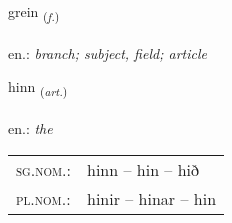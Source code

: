 \documentclass[frontgrid, backgrid]{flacards}\usepackage[]{graphicx}\usepackage[]{xcolor}
\begin{document}
\renewcommand{\flhead}{\vskip5pt \fboxsep=0pt {\small\bfseries\footnotesize Nafnorð | Noun}}
\renewcommand{\fcfoot}{\vskip5pt \fboxsep=0pt \hspace{2pt}{\small\bfseries\footnotesize 1K}}

\renewcommand{\blhead}{\vskip5pt {\small\bfseries\footnotesize Nafnorð | Noun }}
\renewcommand{\bcfoot}{\vskip5pt \hspace{2pt}{\small\bfseries\footnotesize 1K}}


{grein \small{\textsubscript{(\textit{f.})}} \\[1ex] %
\textphonetic{[kreiːn]} \\
en.: \emph{branch; subject, field; article} \\  [2ex]
\renewcommand*{\arraystretch}{0.8}
}

\renewcommand{\flhead}{\vskip5pt \fboxsep=0pt {\small\bfseries\footnotesize Greinir | Article}}
\renewcommand{\fcfoot}{\vskip5pt \fboxsep=0pt \hspace{2pt}{\small\bfseries\footnotesize 1K}}

\renewcommand{\blhead}{\vskip5pt {\small\bfseries\footnotesize Greinir | Article }}
\renewcommand{\bcfoot}{\vskip5pt \hspace{2pt}{\small\bfseries\footnotesize 1K}}


{hinn \small{\textsubscript{(\textit{art.})}} \\[1ex] %
\textphonetic{[hɪn]} \\
en.: \emph{the} \\  [2ex]
\renewcommand*{\arraystretch}{0.8}
\begin{tabular}{ll}
\textsc{sg.nom.}: & hinn  --  hin -- hið \\ 
\textsc{pl.nom.}: & hinir -- hinar -- hin
\end{tabular}
}
\end{document}
